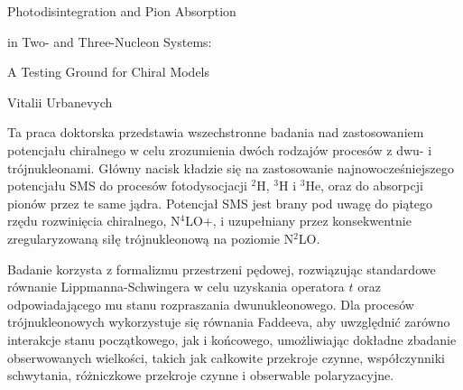 \documentclass[a4paper, 14pt]{extarticle}
\begin{document}

\Large
 \begin{center}
    Photodisintegration and Pion Absorption
    
    in Two- and Three-Nucleon Systems:
    
    A Testing Ground for Chiral Models

\hspace{10pt}

\large
Vitalii Urbanevych \\

\hspace{10pt}


\end{center}

\hspace{10pt}

\normalsize

Ta praca doktorska przedstawia wszechstronne badania nad zastosowaniem potencja\l{}u chiralnego w celu zrozumienia dw\'och rodzaj\'ow proces\'ow z dwu- i tr\'ojnukleonami.
G\l{}\'owny nacisk k\l{}adzie si\k{e} na zastosowanie najnowocześniejszego potencja\l{}u SMS do proces\'ow fotodysocjacji $^2$H, $^3$H i $^3$He,
oraz do absorpcji pion\'ow przez te same j\k{a}dra.
Potencja\l{} SMS jest brany pod uwag\k{e} do pi\k{a}tego rz\k{e}du rozwini\k{e}cia chiralnego, N$^4$LO+, i uzupe\l{}niany przez konsekwentnie zregularyzowan\k{a} si\l{}\k{e} tr\'ojnukleonow\k{a} na poziomie N$^2$LO.

Badanie korzysta z formalizmu przestrzeni p\k{e}dowej, rozwi\k{a}zuj\k{a}c standardowe r\'ownanie Lippmanna-Schwingera w celu uzyskania operatora $t$ oraz odpowiadaj\k{a}cego mu stanu rozpraszania dwunukleonowego. Dla proces\'ow tr\'ojnukleonowych wykorzystuje si\k{e} r\'ownania Faddeeva, aby uwzgl\k{e}dni\'c zar\'owno interakcje stanu pocz\k{a}tkowego, jak i końcowego, umo\.zliwiaj\k{a}c dok\l{}adne zbadanie obserwowanych wielkości, takich jak ca\l{}kowite przekroje czynne, wsp\'o\l{}czynniki schwytania, r\'o\.zniczkowe przekroje czynne i obserwable polaryzacyjne.
\end{document}
